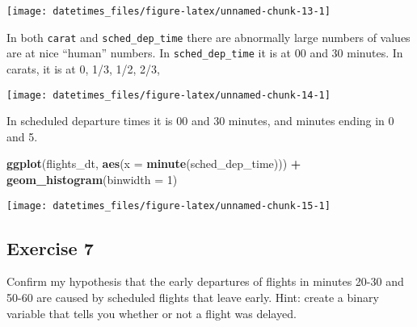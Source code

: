 \documentclass[]{book}
\newenvironment{Shaded}{\begin{snugshade}}{\end{snugshade}}
\newcommand{\DataTypeTok}[1]{\textcolor[rgb]{0.13,0.29,0.53}{#1}}
\newcommand{\DecValTok}[1]{\textcolor[rgb]{0.00,0.00,0.81}{#1}}
\newcommand{\KeywordTok}[1]{\textcolor[rgb]{0.13,0.29,0.53}{\textbf{#1}}}
\newcommand{\NormalTok}[1]{#1}
\newcommand{\OperatorTok}[1]{\textcolor[rgb]{0.81,0.36,0.00}{\textbf{#1}}}
\newcommand{\StringTok}[1]{\textcolor[rgb]{0.31,0.60,0.02}{#1}}
\theoremstyle{definition}
\theoremstyle{definition}
\theoremstyle{definition}
\theoremstyle{remark}
\begin{document}
\begin{center}\texttt{[image: datetimes\_files/figure-latex/unnamed-chunk-13-1]} \end{center}

In both \texttt{carat} and \texttt{sched\_dep\_time} there are
abnormally large numbers of values are at nice ``human'' numbers. In
\texttt{sched\_dep\_time} it is at 00 and 30 minutes. In carats, it is
at 0, 1/3, 1/2, 2/3,

\begin{Shaded}
\end{Shaded}

\begin{center}\texttt{[image: datetimes\_files/figure-latex/unnamed-chunk-14-1]} \end{center}

In scheduled departure times it is 00 and 30 minutes, and minutes ending
in 0 and 5.

\begin{Shaded}
\begin{Highlighting}[]
\KeywordTok{ggplot}\NormalTok{(flights_dt, }\KeywordTok{aes}\NormalTok{(}\DataTypeTok{x =} \KeywordTok{minute}\NormalTok{(sched_dep_time))) }\OperatorTok{+}
\StringTok{  }\KeywordTok{geom_histogram}\NormalTok{(}\DataTypeTok{binwidth =} \DecValTok{1}\NormalTok{)}
\end{Highlighting}
\end{Shaded}

\begin{center}\texttt{[image: datetimes\_files/figure-latex/unnamed-chunk-15-1]} \end{center}

\hypertarget{exercise-7-3}{%
\subsection{Exercise 7}\label{exercise-7-3}}

Confirm my hypothesis that the early departures of flights in minutes
20-30 and 50-60 are caused by scheduled flights that leave early. Hint:
create a binary variable that tells you whether or not a flight was
delayed.
\end{document}
